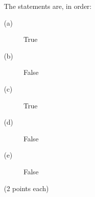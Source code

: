 The statements are, in order:

\begin{description}
\item[(a)] True
\item[(b)] False
\item[(c)] True
\item[(d)] False
\item[(e)] False
\end{description}

\hfill(2 points each)
